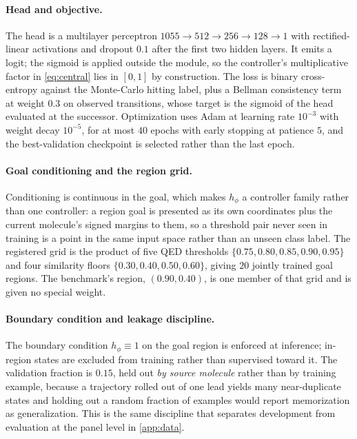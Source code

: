 \paragraph{Head and objective.}
The head is a multilayer perceptron $1055\rightarrow512\rightarrow256\rightarrow128\rightarrow1$ with rectified-linear activations and dropout $0.1$ after the first two hidden layers. It emits a logit; the sigmoid is applied outside the module, so the controller's multiplicative factor in \eqref{eq:central} lies in $[0,1]$ by construction. The loss is binary cross-entropy against the Monte-Carlo hitting label, plus a Bellman consistency term at weight $0.3$ on observed transitions, whose target is the sigmoid of the head evaluated at the successor. Optimization uses Adam at learning rate $10^{-3}$ with weight decay $10^{-5}$, for at most $40$ epochs with early stopping at patience $5$, and the best-validation checkpoint is selected rather than the last epoch.

\paragraph{Goal conditioning and the region grid.}
Conditioning is continuous in the goal, which makes $h_\phi$ a controller family rather than one controller: a region goal is presented as its own coordinates plus the current molecule's signed margins to them, so a threshold pair never seen in training is a point in the same input space rather than an unseen class label. The registered grid is the product of five QED thresholds $\{0.75,0.80,0.85,0.90,0.95\}$ and four similarity floors $\{0.30,0.40,0.50,0.60\}$, giving $20$ jointly trained goal regions. The benchmark's region, $(0.90,0.40)$, is one member of that grid and is given no special weight.

\paragraph{Boundary condition and leakage discipline.}
The boundary condition $h_\phi\equiv1$ on the goal region is enforced at inference; in-region states are excluded from training rather than supervised toward it. The validation fraction is $0.15$, held out \emph{by source molecule} rather than by training example, because a trajectory rolled out of one lead yields many near-duplicate states and holding out a random fraction of examples would report memorization as generalization. This is the same discipline that separates development from evaluation at the panel level in \cref{app:data}.

